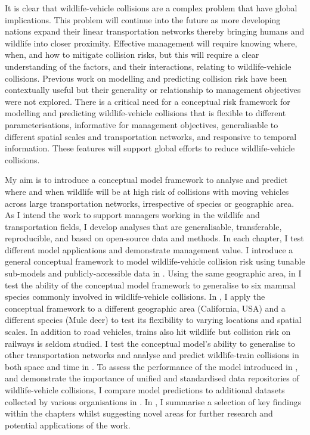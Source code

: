 It is clear that wildlife-vehicle collisions are a complex problem that have global implications. This problem will continue into the future as more developing nations expand their linear transportation networks thereby bringing humans and wildlife into closer proximity. Effective management will require knowing where, when, and how to mitigate collision risks, but this will require a clear understanding of the factors, and their interactions, relating to wildlife-vehicle collisions. Previous work on modelling and predicting collision risk have been contextually useful but their generality or relationship to management objectives were not explored. There is a critical need for a conceptual risk framework for modelling and predicting wildlife-vehicle collisions that is flexible to different parameterisations, informative for management objectives, generalisable to different spatial scales and transportation networks, and responsive to temporal information. These features will support global efforts to reduce wildlife-vehicle collisions.

My aim is to introduce a conceptual model framework to analyse and predict where and when wildlife will be at high risk of collisions with moving vehicles across large transportation networks, irrespective of species or geographic area. As I intend the work to support managers working in the wildlife and transportation fields, I develop analyses that are generalisable, transferable, reproducible, and based on open-source data and methods. In each chapter, I test different model applications and demonstrate management value. I introduce a general conceptual framework to model wildlife-vehicle collision risk using tunable sub-models and publicly-accessible data in . Using the same geographic area, in  I test the ability of the conceptual model framework to generalise to six mammal species commonly involved in wildlife-vehicle collisions. In , I apply the conceptual framework to a different geographic area (California, USA) and a different species (Mule deer) to test its flexibility to varying locations and spatial scales. In addition to road vehicles, trains also hit wildlife but collision risk on railways is seldom studied. I test the conceptual model's ability to generalise to other transportation networks and analyse and predict wildlife-train collisions in both space and time in . To assess the performance of the model introduced in , and demonstrate the importance of unified and standardised data repositories of wildlife-vehicle collisions, I compare model predictions to additional datasets collected by various organisations in . In , I summarise a selection of key findings within the chapters whilst suggesting novel areas for further research and potential applications of the work.